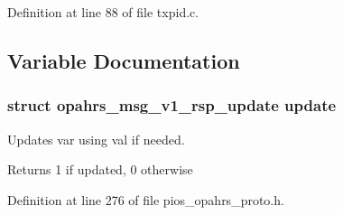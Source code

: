 Definition at line 88 of file txpid.\-c.



\subsection{Variable Documentation}
\hypertarget{group___tx_p_i_d_module_ga4954ac5b993eef7c92515d6a5284a4f7}{
\subsubsection[{update}]{\setlength{\rightskip}{0pt plus 5cm}struct {\bf opahrs\-\_\-msg\-\_\-v1\-\_\-rsp\-\_\-update} update}}\label{group___tx_p_i_d_module_ga4954ac5b993eef7c92515d6a5284a4f7}
Updates var using val if needed. \begin{DoxyReturn}{Returns}
1 if updated, 0 otherwise 
\end{DoxyReturn}


Definition at line 276 of file pios\-\_\-opahrs\-\_\-proto.\-h.


